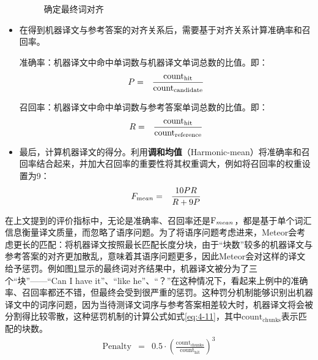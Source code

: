 \begin{itemize}
\begin{figure}[htp]
    \centering
	
   	\caption{确定最终词对齐}
  	 \label{fig:4-6}
\end{figure}
\item 在得到机器译文与参考答案的对齐关系后，需要基于对齐关系计算准确率和召回率。

准确率：机器译文中命中单词数与机器译文单词总数的比值。即：
\begin{eqnarray}
{P} &=& \frac {\textrm{count}_{\textrm{hit}}}{\textrm{count}_{\textrm{candidate}}}
\label{eq:4-8}
\end{eqnarray}

召回率：机器译文中命中单词数与参考答案单词总数的比值。即：
\begin{eqnarray}
{R} &=& \frac {\textrm{count}_{\textrm{hit}}}{\textrm{count}_{\textrm{reference}}}
\label{eq:4-9}
\end{eqnarray}

\vspace{0.5em}
\item 最后，计算机器译文的得分。利用{\small\sffamily\bfseries{调和均值}}（Harmonic-mean）将准确率和召回率结合起来，并加大召回率的重要性将其权重调大，例如将召回率的权重设置为9：
\begin{eqnarray}
{F_{\textrm mean}} &=& \frac {10{PR}}{{R+9P}}
\label{eq:4-10}
\end{eqnarray}
\vspace{0.5em}
\end{itemize}

\parinterval 在上文提到的评价指标中，无论是准确率、召回率还是$\textrm F_{mean}$，都是基于单个词汇信息衡量译文质量，而忽略了语序问题。为了将语序问题考虑进来，Meteor会考虑更长的匹配：将机器译文按照最长匹配长度分块，由于“块数”较多的机器译文与参考答案的对齐更加散乱，意味着其语序问题更多，因此Meteor会对这样的译文给予惩罚。例如图\ref{fig:4-6}显示的最终词对齐结果中，机器译文被分为了三个“块”——“Can I have it”、“like he”、“？”在这种情况下，看起来上例中的准确率、召回率都还不错，但最终会受到很严重的惩罚。这种罚分机制能够识别出机器译文中的词序问题，因为当待测译文词序与参考答案相差较大时，机器译文将会被分割得比较零散，这种惩罚机制的计算公式如式\eqref{eq:4-11}，其中$\textrm {count}_{\textrm{chunks}}$表示匹配的块数。
\begin{eqnarray}
\textrm {Penalty} &=& 0.5 \cdot {\left({\frac{{\textrm {count}}_{\textrm {chunks}}}{\textrm {count}_{\textrm{hit}}}} \right)^3}
\label{eq:4-11}
\end{eqnarray}

